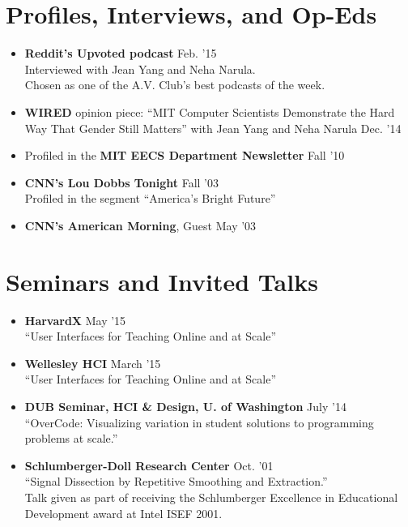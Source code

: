\documentclass[margin]{res}
\begin{document}
\begin{resume}
\begin{itemize}[leftmargin=*]
\end{itemize}

\section{Profiles, Interviews, and Op-Eds}
\begin{itemize}[leftmargin=*] \itemsep -2pt 
\item {\bf Reddit's Upvoted podcast} \hfill Feb. '15 \\ Interviewed with Jean Yang and Neha Narula.\\
Chosen as one of the A.V. Club's best podcasts of the week.
\item {\bf WIRED} opinion piece: ``MIT Computer Scientists Demonstrate the Hard Way That Gender Still Matters'' with Jean Yang and Neha Narula \hfill Dec. '14
\item Profiled in the {\bf MIT EECS Department Newsletter} \hfill Fall '10
\item \textbf{CNN's Lou Dobbs Tonight}  \hfill Fall '03 \\ Profiled in the segment ``America's Bright Future''
\item \textbf{CNN's American Morning}, Guest \hfill May '03
\end{itemize}

\section{Seminars and Invited Talks}

\begin{itemize}[leftmargin=*] \itemsep -2pt
\item {\bf HarvardX}  \hfill May '15 \\``User Interfaces for Teaching Online and at Scale''

\item {\bf Wellesley HCI}  \hfill March '15 \\``User Interfaces for Teaching Online and at Scale''


\item {\bf DUB Seminar, HCI \& Design, U. of Washington} \hfill July '14 \\``OverCode: Visualizing variation in student solutions to programming problems at scale.''

\item {\bf Schlumberger-Doll Research Center} \hfill Oct. '01 \\``Signal Dissection by Repetitive Smoothing and Extraction.'' \\
Talk given as part of receiving the Schlumberger Excellence in Educational Development award at Intel ISEF 2001.
\end{itemize}



\end{resume}
\end{document}
